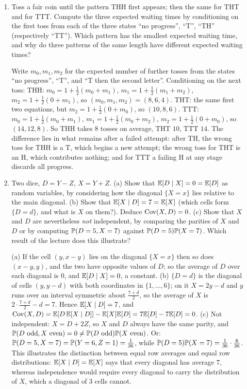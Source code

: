 \begin{enumerate}[series=quiz,label=\arabic*.,leftmargin=2.6em]
\item Toss a fair coin until the pattern THH first appears; then the same for THT and for TTT. Compute the three expected waiting times by conditioning on the first toss from each of the three states ``no progress'', ``T'', ``TH'' (respectively ``TT''). Which pattern has the smallest expected waiting time, and why do three patterns of the same length have different expected waiting times?
\begin{solution}
Write $m_0,m_1,m_2$ for the expected number of further tosses from the states ``no progress'', ``T'', and ``T then the second letter''. Conditioning on the next toss:
THH: $m_0=1+\tfrac12(m_0+m_1)$, $m_1=1+\tfrac12(m_1+m_2)$, $m_2=1+\tfrac12(0+m_1)$, so $(m_0,m_1,m_2)=(8,6,4)$.
THT: the same first two equations, but $m_2=1+\tfrac12(0+m_0)$, so $(10,8,6)$.
TTT: $m_0=1+\tfrac12(m_0+m_1)$, $m_1=1+\tfrac12(m_0+m_2)$, $m_2=1+\tfrac12(0+m_0)$, so $(14,12,8)$.
So THH takes $8$ tosses on average, THT $10$, TTT $14$. The difference lies in what remains after a failed attempt: after TH, the wrong toss for THH is a T, which begins a new attempt; the wrong toss for THT is an H, which contributes nothing; and for TTT a failing H at any stage discards all progress.
\end{solution}

\item Two dice, $D=Y-Z$, $X=Y+Z$. (a) Show that $\mathbb{E}[D\mid X]=0=\mathbb{E}[D]$ as random variables, by considering how the diagonal $\{X=x\}$ lies relative to the main diagonal. (b) Show that $\mathbb{E}[X\mid D]=7=\mathbb{E}[X]$ (which cells form $\{D=d\}$, and what is $X$ on them?). Deduce $\operatorname{Cov}(X,D)=0$. (c) Show that $X$ and $D$ are nevertheless \emph{not} independent, by comparing the parities of $X$ and $D$ or by computing $\mathbb{P}(D=5,X=7)$ against $\mathbb{P}(D=5)\mathbb{P}(X=7)$. Which result of the lecture does this illustrate?
\begin{solution}
(a) If the cell $(y,x-y)$ lies on the diagonal $\{X=x\}$ then so does $(x-y,y)$, and the two have opposite values of $D$; so the average of $D$ over each diagonal is $0$, and $\mathbb{E}[D\mid X]=0$, a constant.
(b) $\{D=d\}$ is the diagonal of cells $(y,y-d)$ with both coordinates in $\{1,\dots,6\}$; on it $X=2y-d$ and $y$ runs over an interval symmetric about $\tfrac{7+d}2$, so the average of $X$ is $2\cdot\tfrac{7+d}2-d=7$. Hence $\mathbb{E}[X\mid D]=7$, and $\operatorname{Cov}(X,D)=\mathbb{E}[D\,\mathbb{E}[X\mid D]]-\mathbb{E}[X]\mathbb{E}[D]=7\mathbb{E}[D]-7\mathbb{E}[D]=0$.
(c) Not independent: $X=D+2Z$, so $X$ and $D$ always have the same parity, and $\mathbb{P}(D\text{ odd},X\text{ even})=0\ne\mathbb{P}(D\text{ odd})\mathbb{P}(X\text{ even})$. Or: $\mathbb{P}(D=5,X=7)=\mathbb{P}(Y=6,Z=1)=\tfrac1{36}$, while $\mathbb{P}(D=5)\mathbb{P}(X=7)=\tfrac1{36}\cdot\tfrac6{36}$.
This illustrates the distinction between equal row averages and equal row distributions: $\mathbb{E}[X\mid D]=\mathbb{E}[X]$ says that every diagonal has average $7$, whereas independence would require every diagonal to carry the distribution of $X$, which a diagonal of $3$ cells cannot.
\end{solution}


\end{enumerate}
